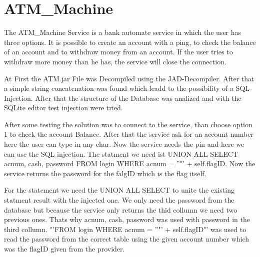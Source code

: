 \chapter{ATM\_Machine}

The ATM\_Machine Service is a bank automate service in which the user has three options. It is possible to create an account with a ping, to check the balance of an account and to withdraw money from an account. If the user tries to withdraw more money than he has, the service will close the connection. 

At First the ATM.jar File was Decompiled using the JAD-Decompiler. After that a simple string concatenation was found which leadd to the possibility of a SQL-Injection. After that the structure of the Database was analized and with the SQLite editor test injection were tried. 

After some testing the solution was to connect to the service, than choose option 1 to check the account Balance. After that the service ask for an account number here the user can type in any char. Now the service needs the pin and here we can use the SQL injection.
The statment we need ist UNION ALL SELECT acnum, cash, password FROM login WHERE acnum = ''"' + self.flagID. Now the service returns the password for the falgID which is the flag itself.

For the statement we need the UNION ALL SELECT to unite the existing statment result with the injected one. We only need the password from the database but because the service only returns the thid collumn we need two previous ones. Thats why acnum, cash, password was used with password in the third collumn. "'FROM login WHERE acnum = ''"' + self.flagID"' was used to read the password from the correct table using the given account number which was the flagID given from the provider.



